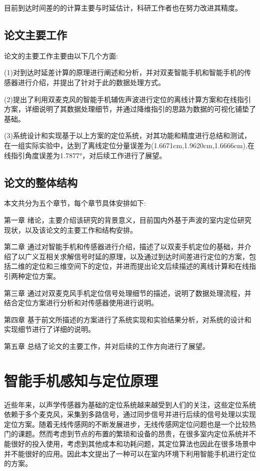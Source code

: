 \documentclass[winfonts]{njuthesis}
\begin{document}
		目前到达时间差的的计算主要与时延估计，科研工作者也在努力改进其精度。
		

	\section{论文主要工作}

		论文的主要工作主要由以下几个方面:
		
		(1)对到达时延差计算的原理进行阐述和分析，并对双麦智能手机和智能手机的传感器进行介绍，并提出了针对于此的数据处理方式。
		
		(2)提出了利用双麦克风的智能手机辅佐声波进行定位的离线计算方案和在线指引方案，详细说明了其数据处理细节，并通过降维指引的思路为数据的可视化铺垫了基础。
		
		(3)系统设计和实现基于以上方案的定位系统，对其功能和精度进行总结和测试，在一组实际实验中，达到了离线定位分量误差为(1.6671cm,1.9620cm,1.6666cm),在线指引角度误差为1.7877°，对后续工作进行了展望。

	\section{论文的整体结构}
		本文共分为五个章节，每个章节具体安排如下:
		
		第一章 绪论，主要介绍该研究的背景意义，目前国内外基于声波的室内定位研究现状，以及该论文的主要工作和结构安排。
		 
		第二章 通过对智能手机和传感器进行介绍，描述了以双麦手机定位的基础，并介绍了以广义互相关求解信号时延的原理，以及通过到达时间差进行定位的方案，包括二维的定位和三维空间下的定位，并进而提出论文后续描述的离线计算和在线指引两种定位方案。
		
		第三章 通过对双麦克风手机定位信号处理细节的描述，说明了数据处理流程，并结合定位方案进行分析和对传感器使用进行说明。
		
		第四章 基于前文所描述的方案进行了系统实现和实验结果分析，对系统的设计和实现细节进行了详细的说明。
		
		第五章 总结了论文的主要工作，并对后续的工作方向进行了展望。
		
\chapter{智能手机感知与定位原理}\label{chapter_mobile}
	
	近些年来，以声学传感器为基础的定位系统越来越受到人们的关注，这些定位系统依赖于多个麦克风，采集到多路信号，通过同步信号并进行后续的信号处理以实现定位方案。随着无线传感网的不断发展进步，无线传感网定位问题也是一个比较热门的课题。然而考虑到节点的布置的繁琐和设备的昂贵，在很多室内定位系统并不能很好的投入使用，考虑到其他成本和功耗问题，其定位算法也因此在很多场景中并不能很好的应用。因此本文提出了一种可以在室内环境下利用智能手机进行定位的方案。
	
\end{document}
